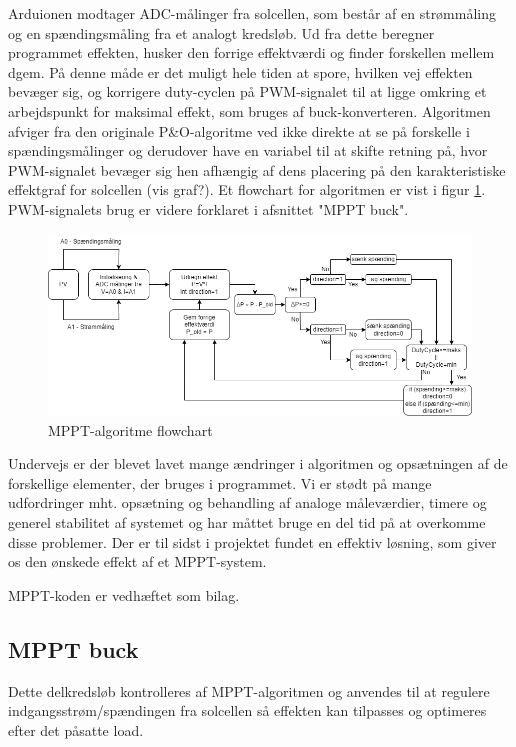 \documentclass[../main.tex]{subfiles}
\begin{document}
    Arduionen modtager ADC-målinger fra solcellen, som består af en strømmåling og en spændingsmåling fra et analogt kredsløb. Ud fra dette beregner programmet effekten, husker den forrige effektværdi og finder forskellen mellem dgem. På denne måde er det muligt hele tiden at spore, hvilken vej effekten bevæger sig, og korrigere duty-cyclen på PWM-signalet til at ligge omkring et arbejdspunkt for maksimal effekt, som bruges af buck-konverteren. Algoritmen afviger fra den originale P&O-algoritme ved ikke direkte at se på forskelle i spændingsmålinger og derudover have en variabel til at skifte retning på, hvor PWM-signalet bevæger sig hen afhængig af dens placering på den karakteristiske effektgraf for solcellen (vis graf?). Et flowchart for algoritmen er vist i figur \ref{fig: MPPT Flowchart}.  PWM-signalets brug er videre forklaret i afsnittet "MPPT buck".

    \begin{figure}[H]
      \includegraphics[width=\textwidth]{Dokumentation/mpptflowchart.drawio (1).png}
     \caption{MPPT-algoritme flowchart}
     \label{fig: MPPT Flowchart}
     \end{figure}
    
    Undervejs er der blevet lavet mange ændringer i algoritmen og opsætningen af de forskellige elementer, der bruges i programmet. Vi er stødt på mange udfordringer mht. opsætning og behandling af analoge måleværdier, timere og generel stabilitet af systemet og har måttet bruge en del tid på at overkomme disse problemer. Der er til sidst i projektet fundet en effektiv løsning, som giver os den ønskede effekt af et MPPT-system.

    MPPT-koden er vedhæftet som bilag.


    \subsection{MPPT buck}
        Dette delkredsløb kontrolleres af MPPT-algoritmen og anvendes til at regulere indgangsstrøm/spændingen fra solcellen så effekten kan tilpasses og optimeres efter det påsatte load.
        
\end{document}
